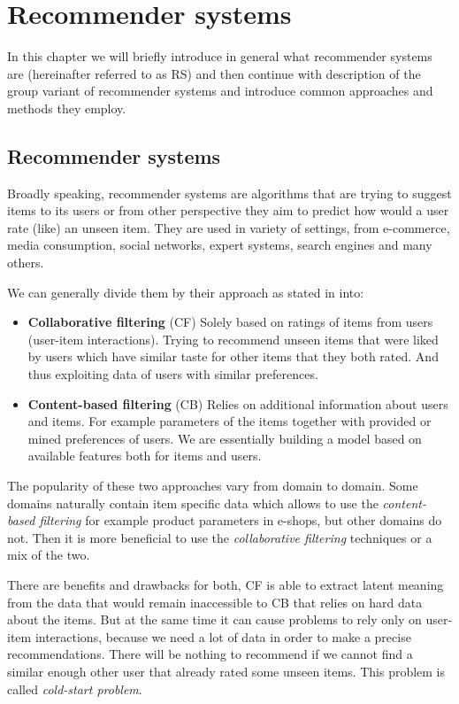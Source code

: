 \chapter{Recommender systems} \label{chap_recommender_systems}
In this chapter we will briefly introduce in general what recommender systems are (hereinafter referred to as RS) and then continue with description of the group variant of recommender systems and introduce common approaches and methods they employ.


\section{Recommender systems}
Broadly speaking, recommender systems are algorithms that are trying to suggest items to its users or from other perspective they aim to predict how would a user rate (like) an unseen item. They are used in variety of settings, from e-commerce, media consumption, social networks, expert systems, search engines and many others.

We can generally divide them by their approach as stated in \cite{ricci2011introduction} into:
\begin{itemize}
    \item \textbf{Collaborative filtering} (CF)\newline
        Solely based on ratings of items from users (user-item interactions). Trying to recommend unseen items that were liked by users which have similar taste for other items that they both rated. And thus exploiting data of users with similar preferences.
    \item  \textbf{Content-based filtering} (CB)\newline
        Relies on additional information about users and items. For example parameters of the items together with provided or mined preferences of users. We are essentially building a model based on available features both for items and users.
\end{itemize}

The popularity of these two approaches vary from domain to domain. Some domains naturally contain item specific data which allows to use the \textit{content-based filtering} for example product parameters in e-shops, but other domains do not. Then it is more beneficial to use the \textit{collaborative filtering} techniques or a mix of the two.

There are benefits and drawbacks for both, CF is able to extract latent meaning from the data that would remain inaccessible to CB that relies on hard data about the items. But at the same time it can cause problems to rely only on user-item interactions, because we need a lot of data in order to make a precise recommendations. There will be nothing to recommend if we cannot find a similar enough other user that already rated some unseen items. This problem is called \textit{cold-start problem}.

